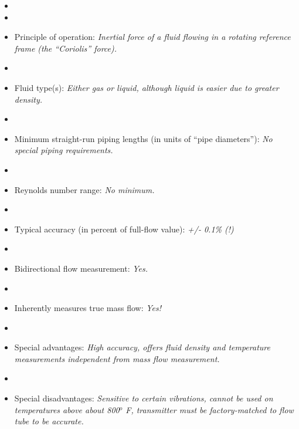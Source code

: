 \begin{itemize}
\goodbreak
\item{} 
\vskip 5pt
\item\item{} Principle of operation: {\it Inertial force of a fluid flowing in a rotating reference frame (the ``Coriolis'' force).}
\vskip 5pt
\item\item{} Fluid type(s): {\it Either gas or liquid, although liquid is easier due to greater density.}
\vskip 5pt
\item\item{} Minimum straight-run piping lengths (in units of ``pipe diameters''): {\it No special piping requirements.}
\vskip 5pt
\item\item{} Reynolds number range: {\it No minimum.}
\vskip 5pt
\item\item{} Typical accuracy (in percent of full-flow value): {\it +/- 0.1\% (!)}
\vskip 5pt
\item\item{} Bidirectional flow measurement: {\it Yes.}
\vskip 5pt
\item\item{} Inherently measures true mass flow: {\it Yes!}
\vskip 5pt
\item\item{} Special advantages: {\it High accuracy, offers fluid density and temperature measurements independent from mass flow measurement.}
\vskip 5pt
\item\item{} Special disadvantages: {\it Sensitive to certain vibrations, cannot be used on temperatures above about 800$^{o}$ F, transmitter must be factory-matched to flow tube to be accurate.}
\end{itemize}

